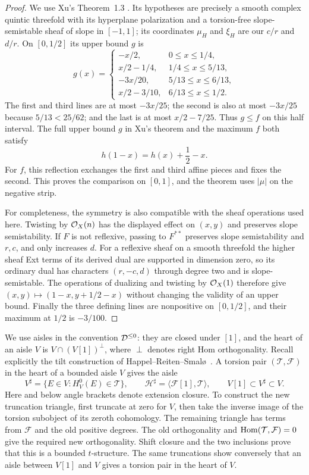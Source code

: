 \begin{proof}
We use Xu's Theorem~1.3 \cite{Xu2026}.  Its hypotheses are precisely a
smooth complex quintic threefold with its hyperplane polarization and a
torsion-free slope-semistable sheaf of slope in $[-1,1]$; its coordinates
$\mu_H$ and $\xi_H$ are our $c/r$ and $d/r$.  On $[0,1/2]$ its upper
bound $g$ is
\[
g(x)=
\begin{cases}
-x/2,&0\leq x\leq1/4,\\
x/2-1/4,&1/4\leq x\leq5/13,\\
-3x/20,&5/13\leq x\leq6/13,\\
x/2-3/10,&6/13\leq x\leq1/2.
\end{cases}
\]
The first and third lines are at most $-3x/25$; the second is also at
most $-3x/25$ because $5/13<25/62$; and the last is at most
$x/2-7/25$.  Thus $g\leq f$ on this half interval.  The full upper
bound $g$ in Xu's theorem and the maximum $f$ both satisfy
\[
 h(1-x)=h(x)+\frac12-x.
\]
For $f$, this reflection exchanges the first and third affine pieces
and fixes the second.  This proves the comparison on $[0,1]$, and the
theorem uses $|\mu|$ on the negative strip.

For completeness, the symmetry is also compatible with the sheaf
operations used here.  Twisting by $\mathcal O_X(n)$ has the displayed effect
on $(x,y)$ and preserves slope semistability.  If $F$ is not reflexive,
passing to $F^{**}$ preserves slope semistability and $r,c$, and only
increases $d$.  For a reflexive sheaf on a smooth threefold the higher
sheaf Ext terms of its derived dual are supported in dimension zero,
so its ordinary dual has characters $(r,-c,d)$ through degree two and
is slope-semistable.  The operations of dualizing and twisting by
$\mathcal O_X(1)$ therefore give $(x,y)\mapsto(1-x,y+1/2-x)$ without changing
the validity of an upper bound.  Finally the three defining lines are
nonpositive on $[0,1/2]$, and their maximum at $1/2$ is $-3/100$.
\end{proof}

We use aisles in the convention $\mathcal D^{\leq0}$: they are closed under
$[1]$, and the heart of an aisle $V$ is $V\cap(V[1])^\perp$, where
$\perp$ denotes right Hom orthogonality.  Recall explicitly the tilt
construction of Happel--Reiten--Smal\o\ \cite{HappelReitenSmalo1996}.
A torsion pair $(\mathcal T,\mathcal F)$ in the heart of
a bounded aisle $V$ gives the aisle
\begin{equation}\label{eq:aisle-tilt}
 V^\sharp=\{E\in V:H^0_V(E)\in\mathcal T\},\qquad
 \mathcal H^\sharp=\langle\mathcal F[1],\mathcal T\rangle,
 \qquad V[1]\subset V^\sharp\subset V.
\end{equation}
Here and below angle brackets denote extension closure.  To construct
the new truncation triangle, first truncate at zero for $V$, then take
the inverse image of the torsion subobject of its zeroth cohomology.
The remaining triangle has terms from $\mathcal F$ and the old positive
degrees.  The old orthogonality and
$\operatorname{Hom}(\mathcal T,\mathcal F)=0$ give the required new orthogonality.
Shift closure and the two inclusions prove that this is a bounded
$t$-structure.  The same truncations show conversely that an aisle
between $V[1]$ and $V$ gives a torsion pair in the heart of $V$.

